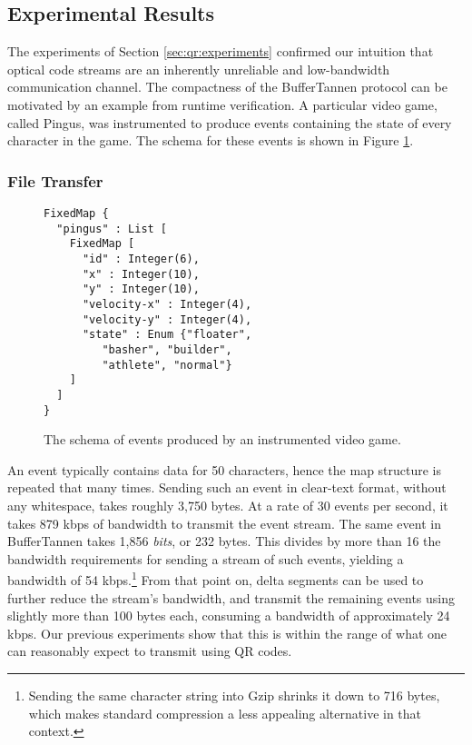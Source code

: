\subsection{Experimental Results}
\setcounter{paragraph}{0}

The experiments of Section \ref{sec:qr:experiments} confirmed our intuition that optical code streams are an inherently unreliable and low-bandwidth communication channel. The compactness of the BufferTannen protocol can be motivated by an example from runtime verification. A particular video game, called Pingus, was instrumented to produce events containing the state of every character in the game. The schema for these events is shown in Figure \ref{fig:qr:pingus-schema}.

\subsubsection{File Transfer}

\begin{figure}
\centering
\begin{verbatim}
FixedMap {
  "pingus" : List [
    FixedMap [
      "id" : Integer(6),
      "x" : Integer(10),
      "y" : Integer(10),
      "velocity-x" : Integer(4),
      "velocity-y" : Integer(4),
      "state" : Enum {"floater",
         "basher", "builder",
         "athlete", "normal"}
    ]
  ]
}
\end{verbatim}
\caption{The schema of events produced by an instrumented video game.}
\label{fig:qr:pingus-schema}
\end{figure}

An event typically contains data for 50 characters, hence the map structure is repeated that many times. Sending such an event in clear-text format, without any whitespace, takes roughly 3,750 bytes. At a rate of 30 events per second, it takes 879 kbps of bandwidth to transmit the event stream. The same event in BufferTannen takes 1,856 \emph{bits}, or 232 bytes. This divides by more than 16 the bandwidth requirements for sending a stream of such events, yielding a bandwidth of 54 kbps.\footnote{Sending the same character string into Gzip shrinks it down to 716 bytes, which makes standard compression a less appealing alternative in that context.} From that point on, delta segments can be used to further reduce the stream's bandwidth, and transmit the remaining events using slightly more than 100 bytes each, consuming a bandwidth of approximately 24 kbps. Our previous experiments show that this is within the range of what one can reasonably expect to transmit using QR codes.

